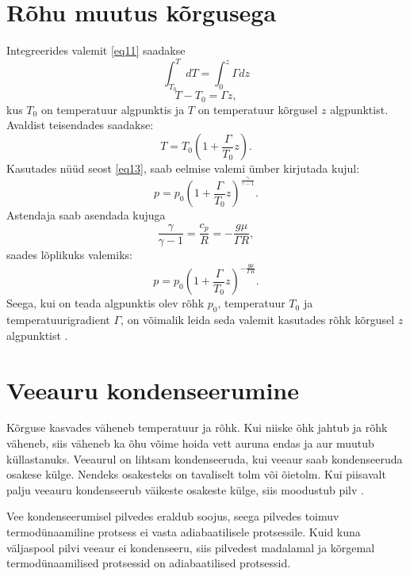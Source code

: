 \documentclass{trkut}%
\begin{document}
\section{Rõhu muutus kõrgusega }
Integreerides valemit \ref{eq11} saadakse
\begin{equation}
\int_{T_0}^{T} dT = \int_{0}^{z} \Gamma dz
\end{equation}
\begin{equation}
T-T_0 = \Gamma z,
\end{equation}
kus $T_0$ on temperatuur algpunktis ja $T$ on temperatuur kõrgusel $z$ algpunktist. Avaldist teisendades saadakse:
\begin{equation}
T = T_0 \left(1+\frac{\Gamma}{T_0}z\right).
\end{equation}
Kasutades nüüd seost \ref{eq13}, saab eelmise valemi ümber kirjutada kujul:
\begin{equation}
p=p_0 \left(1+\frac{\Gamma}{T_0}z\right)^{\frac{\gamma}{\gamma-1}}.
\end{equation}
Astendaja saab asendada kujuga
\begin{equation}
\frac{\gamma}{\gamma-1} = \frac{c_p}{R} = -\frac{g\mu}{\Gamma R},
\end{equation}
saades lõplikuks valemiks:
\begin{equation}\label{eq15}
p=p_0 \left(1+\frac{\Gamma}{T_0}z\right)^{ -\frac{g\mu}{\Gamma R}}.
\end{equation}
Seega, kui on teada algpunktis olev rõhk $p_0$, temperatuur $T_0$ ja temperatuurigradient $\Gamma$, on võimalik leida seda valemit kasutades rõhk kõrgusel $z$ algpunktist \parencite{Texas}.



\section{Veeauru kondenseerumine}
Kõrguse kasvades väheneb temperatuur ja rõhk. Kui niiske õhk jahtub ja rõhk väheneb, siis väheneb ka õhu võime hoida vett auruna endas ja aur muutub küllastanuks. Veeaurul on lihtsam kondenseeruda, kui veeaur saab kondenseeruda osakese külge. Nendeks osakesteks on tavaliselt tolm või õietolm. Kui piisavalt palju veeauru kondenseerub väikeste osakeste külge, siis moodustub pilv \parencite[209]{raamat1}.

Vee kondenseerumisel pilvedes eraldub soojus, seega pilvedes toimuv termodünaamiline protsess ei vasta adiabaatilisele protsessile. Kuid kuna väljaspool pilvi veeaur ei kondenseeru, siis pilvedest madalamal ja kõrgemal termodünaamilised protsessid on adiabaatilised protsessid.
\end{document}
